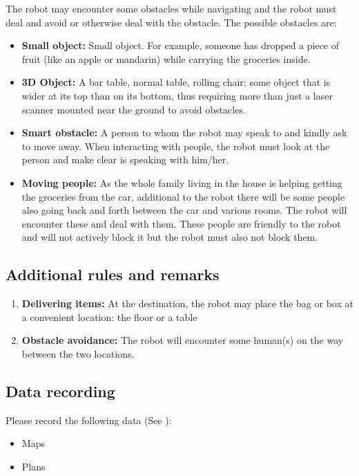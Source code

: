 The robot may encounter some obstacles while navigating and the robot must deal and avoid or otherwise deal with the obstacle. 
The possible obstacles are:
\begin{itemize}
	\item \textbf{Small object:} Small object. For example, someone has dropped a piece of fruit (like an apple or mandarin) while carrying the groceries inside.
	\item \textbf{3D Object:} A bar table, normal table, rolling chair: some object that is wider at its top than on its bottom, 
	  thus requiring more than just a laser scanner mounted near the ground to avoid obstacles. 
	\item \textbf{Smart obstacle:} A person to whom the robot may speak to and kindly ask to move away. 
	  When interacting with people, the robot must look at the person and make clear is speaking with him/her.
	\item \textbf{Moving people:} As the whole family living in the house is helping getting the groceries from the car, 
	  additional to the robot there will be some people also going back and forth between the car and various rooms. 
	  The robot will encounter these and deal with them. These people are friendly to the robot and will not actively block it but the robot must also not block them. 
\end{itemize}

\subsection{Additional rules and remarks}
\begin{enumerate}
  \item \textbf{Delivering items:} At the destination, the robot may place the bag or box at a convenient location: the floor or a table
  \item \textbf{Obstacle avoidance:} The robot will encounter some human(s) on the way between the two locations.  
\end{enumerate}

\subsection{Data recording}
  Please record the following data (See ):
  \begin{itemize}
   \item Maps
   \item Plans
  \end{itemize}

